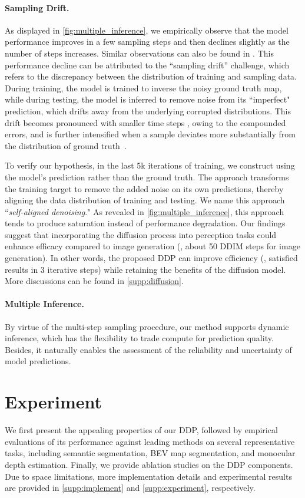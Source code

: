 \documentclass[10pt,twocolumn,letterpaper]{article}
\newcommand{\ours}[0]{DDP\xspace}
\begin{document}
\paragraph{Sampling Drift.}
As displayed in \cref{fig:multiple_inference}, we empirically observe that the model performance improves in a few sampling steps and then declines slightly as the number of steps increases.
Similar observations can also be found in \cite{chen2022diffusiondet,chen2022sampling,saxena2023depthgen}.
This performance decline can be attributed to the ``sampling drift'' challenge, which refers to the discrepancy between the distribution of training and sampling data.
During training, the model is trained to inverse the noisy ground truth map, while during testing, the model is inferred to remove noise from its ``imperfect" prediction, which drifts away from the underlying corrupted distributions.
This drift becomes pronounced with smaller time steps ,  owing to the compounded errors, and is further intensified when a sample deviates more substantially from the distribution of ground truth~\cite{daras2023consistent}.


To verify our hypothesis, in the last 5k iterations of training, we construct  using the model's prediction rather than the ground truth.
The approach transforms the training target to remove the added noise on its own predictions, thereby aligning the data distribution of training and testing. 
We name this approach ``\emph{self-aligned denoising}."
As revealed in \cref{fig:multiple_inference}, this approach tends to produce saturation instead of performance degradation. 
Our findings suggest that incorporating the diffusion process into perception tasks could enhance efficacy compared to image generation (\eg, about 50 DDIM steps for image generation).
In other words, the proposed DDP can improve efficiency (\eg, satisfied results in 3 iterative steps) while retaining the benefits of the diffusion model.
More discussions can be found in \cref{supp:diffusion}.



\paragraph{Multiple Inference.}
By virtue of the multi-step sampling procedure, our method supports dynamic inference, which has the flexibility to trade compute for prediction quality.
Besides, it naturally enables the assessment of the reliability and uncertainty of model predictions.
 \section{Experiment}
We first present the appealing properties of our \ours, followed by empirical evaluations of its performance against leading methods on several representative  tasks, including semantic segmentation, BEV map segmentation, and monocular depth estimation. 
Finally, we provide ablation studies on the \ours components. 
Due to space limitations, 
more implementation details and experimental results are provided in \cref{supp:implement} and \cref{supp:experiment}, respectively.
\end{document}
